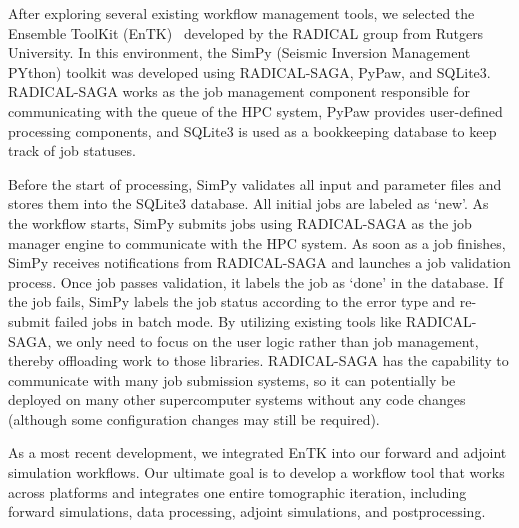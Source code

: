 After exploring several existing workflow management tools,
we selected the Ensemble ToolKit (EnTK)~\cite{EnTK2017} developed by the RADICAL
group from Rutgers University.
In this environment,
the SimPy (Seismic Inversion Management PYthon) toolkit was developed using RADICAL-SAGA, PyPaw, and SQLite3.
RADICAL-SAGA works as the 
job management component responsible for communicating with the queue of the HPC system,
PyPaw provides user-defined processing components,
and SQLite3 is used as a bookkeeping database to keep track of job statuses.

Before the start of processing,
SimPy validates all input and parameter files and stores them
into the SQLite3 database.
All initial jobs are labeled as `new'.
As the workflow starts, SimPy submits jobs using 
RADICAL-SAGA as the job manager engine to communicate with the HPC system.
As soon as a job finishes, SimPy receives notifications from
RADICAL-SAGA and launches a job validation process.
Once job passes validation,
it labels the job as `done' in the database.
If the job fails, SimPy labels
the job status according to the error type and re-submit failed jobs in batch mode.
By utilizing existing tools like RADICAL-SAGA, we only need to focus on the user logic rather
than job management, thereby offloading work to those libraries.
RADICAL-SAGA has the capability to communicate with many job submission systems,
so it can potentially be deployed on many other supercomputer systems without any
code changes (although some configuration changes may still be required).

As a most recent development, we integrated EnTK
into our forward and adjoint simulation workflows. Our ultimate
goal is to develop a workflow tool that works across platforms and integrates one entire tomographic iteration, including forward simulations, data processing, adjoint simulations, and postprocessing.
